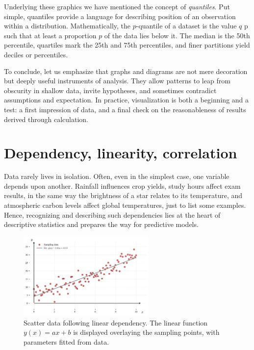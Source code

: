 \documentclass{book}
\begin{document}
\medskip

Underlying these graphics we have mentioned the concept of \textit{quantiles}. Put simple, quantiles provide a language for describing position of an observation within a distribution. Mathematically, the $p$-quantile of a dataset is the value $q$ p such that at least a proportion $p$ of the data lies below it. The median is the 50th percentile, quartiles mark the 25th and 75th percentiles, and finer partitions yield deciles or percentiles. 

\medskip

To conclude, let us emphasize that graphs and diagrams are not mere decoration but deeply useful instruments of analysis. They allow patterns to leap from obscurity in shallow data, invite hypotheses, and sometimes contradict assumptions and expectation. In practice, visualization is both a beginning and a test: a first impression of data, and a final check on the reasonableness of results derived through calculation.

\section{Dependency, linearity, correlation}

Data rarely lives in isolation. Often, even in the simplest case, one variable depends upon another. Rainfall influences crop yields, study hours affect exam results, in the same way the brightness of a star relates to its temperature, and atmospheric carbon levels affect global temperatures, just to list some examples. Hence, recognizing and describing such dependencies lies at the heart of descriptive statistics and prepares the way for predictive models.

\begin{figure}[ht]
    \centering
    \includegraphics[width=0.6\textwidth]{figures/chapter1/linear1.png}
    \caption{Scatter data following linear dependency. The linear function $y(x) = a x + b$ is displayed overlaying the sampling points, with parameters fitted from data.}
    \label{fig:linear1}
\end{figure}
\end{document}

